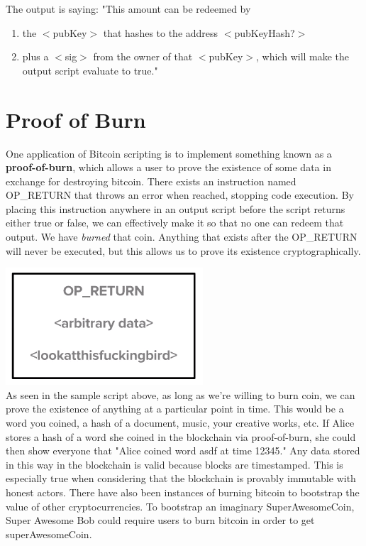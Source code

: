 \documentclass[full.tex]{subfiles}
\begin{document}
 The output is saying: "This amount can be redeemed by
 \begin{enumerate}
     \item the $<$pubKey$>$ that hashes to the address $<$pubKeyHash?$>$
     \item plus a $<$sig$>$ from the owner of that $<$pubKey$>$, which will make the output script evaluate to true."
 \end{enumerate}
 
 \section*{Proof of Burn}
 
 One application of Bitcoin scripting is to implement something known as a \textbf{proof-of-burn}, which allows a user to prove the existence of some data in exchange for destroying bitcoin. There exists an instruction named OP\_RETURN that throws an error when reached, stopping code execution. By placing this instruction anywhere in an output script before the script returns either true or false, we can effectively make it so that no one can redeem that output. We have \textit{burned} that coin. Anything that exists after the OP\_RETURN will never be executed, but this allows us to prove its existence cryptographically.
 
 \includegraphics[scale=1]{burn_script} \\
 
 As seen in the sample script above, as long as we're willing to burn coin, we can prove the existence of anything at a particular point in time. This would be a word you coined, a hash of a document, music, your creative works, etc. If Alice stores a hash of a word she coined in the blockchain via proof-of-burn, she could then show everyone that "Alice coined word asdf at time 12345." Any data stored in this way in the blockchain is valid because blocks are timestamped. This is especially true when considering that the blockchain is provably immutable with honest actors. There have also been instances of burning bitcoin to bootstrap the value of other cryptocurrencies. To bootstrap an imaginary SuperAwesomeCoin, Super Awesome Bob could require users to burn bitcoin in order to get superAwesomeCoin. 
 
\end{document}
